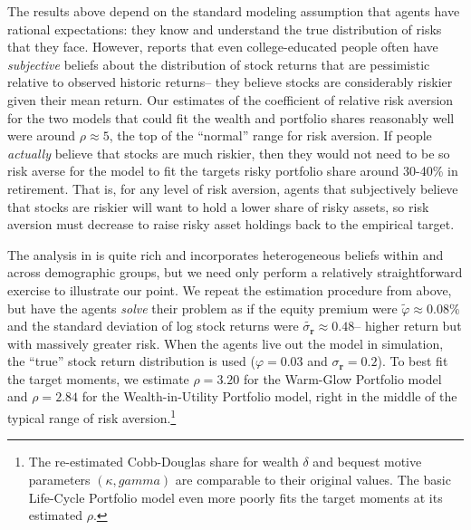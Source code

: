 \documentclass{article}
\newcommand{\CRRA}{\rho}
\newcommand{\eprem}{\varphi}
\newcommand{\risky}{\mathbf{r}}
\begin{document}
The results above depend on the standard modeling assumption that agents have rational expectations: they know and understand the true distribution of risks that they face.
However, \cite{velasquezgiraldoJMP} reports that even college-educated people often have \textit{subjective} beliefs about the distribution of stock returns that are pessimistic relative to observed historic returns-- they believe stocks are considerably riskier given their mean return.
Our estimates of the coefficient of relative risk aversion for the two models that could fit the wealth and portfolio shares reasonably well were around $\CRRA \approx 5$, the top of the ``normal'' range for risk aversion.
If people \textit{actually} believe that stocks are much riskier, then they would not need to be so risk averse for the model to fit the targets risky portfolio share around 30-40\% in retirement.
That is, for any level of risk aversion, agents that subjectively believe that stocks are riskier will want to hold a lower share of risky assets, so risk aversion must decrease to raise risky asset holdings back to the empirical target.

The analysis in \cite{velasquezgiraldoJMP} is quite rich and incorporates heterogeneous beliefs within and across demographic groups, but we need only perform a relatively straightforward exercise to illustrate our point.
We repeat the estimation procedure from above, but have the agents \textit{solve} their problem as if the equity premium were $\widetilde{\eprem} \approx 0.08\%$ and the standard deviation of log stock returns were $\widetilde{\sigma_{\risky}} \approx 0.48$-- higher return but with massively greater risk.
When the agents live out the model in simulation, the ``true'' stock return distribution is used ($\eprem = 0.03$ and $\sigma_\risky = 0.2$).
To best fit the target moments, we estimate $\CRRA = 3.20$ for the Warm-Glow Portfolio model and $\CRRA = 2.84$ for the Wealth-in-Utility Portfolio model, right in the middle of the typical range of risk aversion.\footnote{The re-estimated Cobb-Douglas share for wealth $\delta$ and bequest motive parameters $(\kappa,gamma)$ are comparable to their original values. The basic Life-Cycle Portfolio model even more poorly fits the target moments at its estimated $\CRRA$.}
\end{document}
